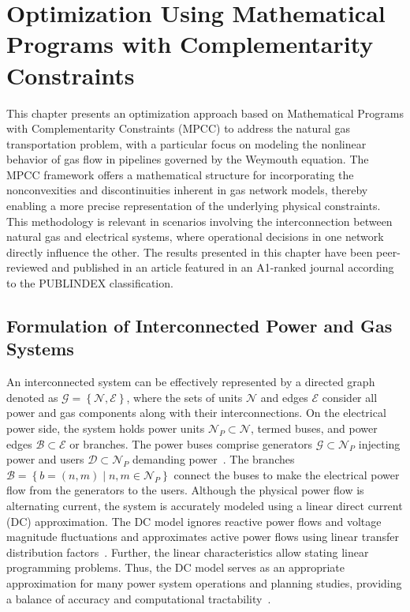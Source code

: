 \chapter{Optimization Using Mathematical Programs with Complementarity Constraints} \label{cap:optimization_mpcc}

This chapter presents an optimization approach based on Mathematical Programs with Complementarity Constraints (MPCC) to address the natural gas transportation problem, with a particular focus on modeling the nonlinear behavior of gas flow in pipelines governed by the Weymouth equation. The MPCC framework offers a mathematical structure for incorporating the nonconvexities and discontinuities inherent in gas network models, thereby enabling a more precise representation of the underlying physical constraints. This methodology is relevant in scenarios involving the interconnection between natural gas and electrical systems, where operational decisions in one network directly influence the other. The results presented in this chapter have been peer-reviewed and published in an article featured in an A1-ranked journal according to the PUBLINDEX classification.

\section{Formulation of Interconnected Power and Gas Systems} \label{sec:formulation}


An interconnected system can be effectively represented by a directed graph denoted as $ \mathcal{G} = \left\lbrace\mathcal{N}, \mathcal{E}\right\rbrace$, where the sets of units $\mathcal{N}$ and edges $\mathcal{E}$ consider all power and gas components along with their interconnections. On the electrical power side, the system holds power units $\mathcal{N}_P\subset\mathcal{N}$, termed buses, and power edges $\mathcal{B}\subset\mathcal{E}$ or branches. The power buses comprise generators $\mathcal{G}\subset\mathcal{N}_P$ injecting power and users $\mathcal{D}\subset\mathcal{N}_P$ demanding power~\cite{WANG2019113410}. The branches $\mathcal{B} = \left\{b=(n,m) \mid n,m\in\mathcal{N}_P \right\}$ connect the buses to make the electrical power flow from the generators to the users. Although the physical power flow is alternating current, the system is accurately modeled using a linear direct current (DC) approximation. The DC model ignores reactive power flows and voltage magnitude fluctuations and approximates active power flows using linear transfer distribution factors~\cite{DC_flow}. Further, the linear characteristics allow stating linear programming problems. Thus, the DC model serves as an appropriate approximation for many power system operations and planning studies, providing a balance of accuracy and computational tractability~\cite{DC_flow2}. 

